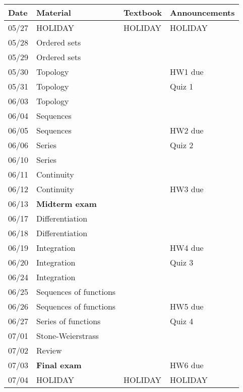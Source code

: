 \documentclass[12pt]{article}
\begin{document}
\begin{tabular}{| l | l | l | l |}\hline
Date & Material & Textbook & Announcements \\ \hline\hline
05/27 & HOLIDAY &  HOLIDAY  & HOLIDAY \\
05/28 & Ordered sets &  &  \\
05/29 & Ordered sets &  &  \\
05/30 & Topology &  & HW1 due \\
05/31 & Topology &  & Quiz 1 \\ \hline \hline  
06/03 & Topology &  &  \\
06/04 & Sequences &  &   \\
06/05 & Sequences &  & HW2 due \\
06/06 & Series &  & Quiz 2 \\ \hline \hline 
06/10 & Series &  &   \\
06/11 & Continuity &  &  \\
06/12 & Continuity &  & HW3 due \\
06/13 & \textbf{Midterm exam} &  &  \\ \hline \hline 
06/17 & Differentiation &  &  \\ 
06/18 & Differentiation &  &  \\
06/19 & Integration &  & HW4 due \\
06/20 & Integration &  & Quiz 3 \\ \hline \hline 
06/24 & Integration &  &  \\
06/25 & Sequences of functions &  & \\
06/26 & Sequences of functions &  & HW5 due \\
06/27 & Series of functions &  & Quiz 4 \\ \hline \hline 
07/01 & Stone-Weierstrass &  &  \\
07/02 & Review & & \\
07/03 & \textbf{Final exam} & & HW6 due  \\
07/04 & HOLIDAY & HOLIDAY & HOLIDAY \\ \hline
\end{tabular}
\end{document}
